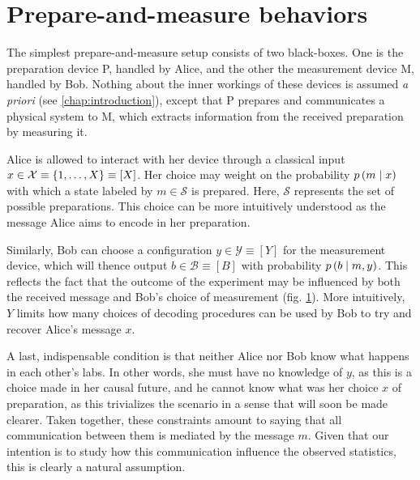     \section{Prepare-and-measure behaviors}

        The simplest prepare-and-measure setup consists of two black-boxes. One is the preparation device P, handled by Alice, and the other the measurement device M, handled by Bob. Nothing about the inner workings of these devices is assumed \emph{a priori} (see \ref{chap:introduction}), except that P prepares and communicates a physical system to M, which extracts information from the received preparation by measuring it.
    
        Alice is allowed to interact with her device through a classical input $x \in \mathcal{X} \equiv \{ 1, \ldots, X \} \equiv [X]$. Her choice may weight on the probability $p \left( m \mid x \right)$ with which a state labeled by $m \in \mathcal{S}$ is prepared. Here, $\mathcal{S}$ represents the set of possible preparations. This choice can be more intuitively understood as the message Alice aims to encode in her preparation.
        
        Similarly, Bob can choose a configuration $y \in \mathcal{Y} \equiv [Y]$ for the measurement device, which will thence output $b \in \mathcal{B} \equiv [B]$ with probability $p \left( b \mid m,y \right)$. This reflects the fact that the outcome of the experiment may be influenced by both the received message and Bob's choice of measurement (fig. \ref{fig:pam}). More intuitively, $Y$ limits how many choices of decoding procedures can be used by Bob to try and recover Alice's message $x$.

        \begin{figure}
            \caption{\todo{}}
            \label{fig:pam}
        \end{figure}
        
        A last, indispensable condition is that neither Alice nor Bob know what happens in each other's labs. In other words, she must have no knowledge of $y$, as this is a choice made in her causal future, and he cannot know what was her choice $x$ of preparation, as this trivializes the scenario in a sense that will soon be made clearer. Taken together, these constraints amount to saying that all communication between them is mediated by the message $m$. Given that our intention is to study how this communication influence the observed statistics, this is clearly a natural assumption.
        
